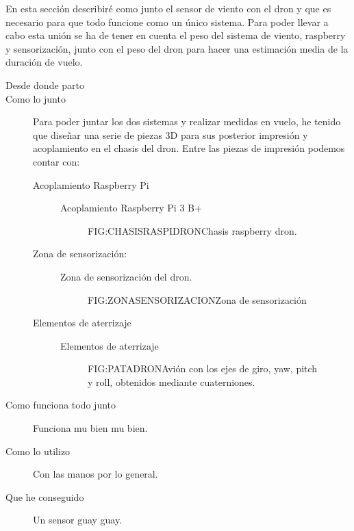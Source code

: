 
En esta sección describiré como junto el sensor de viento con el dron y que es necesario para que todo funcione como un único sistema.
Para poder llevar a cabo esta unión se ha de tener en cuenta el peso del sistema de viento, raspberry y sensorización, junto con el peso del dron para hacer una estimación media de la duración de vuelo.


\begin{description}
\item[Desde donde parto]

\item[Como lo junto] Para poder juntar los dos sistemas y realizar medidas en vuelo, he tenido que diseñar una serie de piezas 3D para sus posterior impresión y acoplamiento en el chasis del dron.
Entre las piezas de impresión podemos contar con:
\begin{description}
\item[Acoplamiento Raspberry Pi]
Acoplamiento Raspberry Pi 3 B+

\begin{figure}{FIG:CHASISRASPIDRON}{Chasis raspberry dron.}
\end{figure}

\item[Zona de sensorización: ] Zona de sensorización del dron.


\begin{figure}[Zona sensorización dron]{FIG:ZONASENSORIZACION}{Zona de sensorización}
	
   \quad
  
\end{figure} 

\item[Elementos de aterrizaje]
Elementos de aterrizaje

\begin{figure}{FIG:PATADRON}{Avión con los ejes de giro, yaw, pitch y roll, obtenidos mediante cuaterniones.}
\end{figure}
\end{description}

\item[Como funciona todo junto] Funciona mu bien mu bien.
\item[Como lo utilizo] Con las manos por lo general.
\item[Que he conseguido] Un sensor guay guay.
\end{description}

